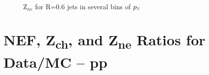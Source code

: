 \documentclass[ALICE]{ALICE_analysis_notes}
\newcommand{\pT}{$p_{\mbox{\tiny T}}$\xspace}
\begin{document}
\begin{appendix}
\begin{figure}[h!]
    \\
    \caption{Z$_{ne}$ for R=0.6 jets in several bins of \pT}
    \label{fig:TriggerBiasZneR06}
\end{figure}

\newpage

\section{NEF, \texorpdfstring{Z\textsubscript{ch}}{Zch}, and \texorpdfstring{Z\textsubscript{ne}}{Zne} Ratios for Data/MC -- pp}
\label{sec:appendixTriggerBiasRatios}




\end{appendix}
\end{document}
